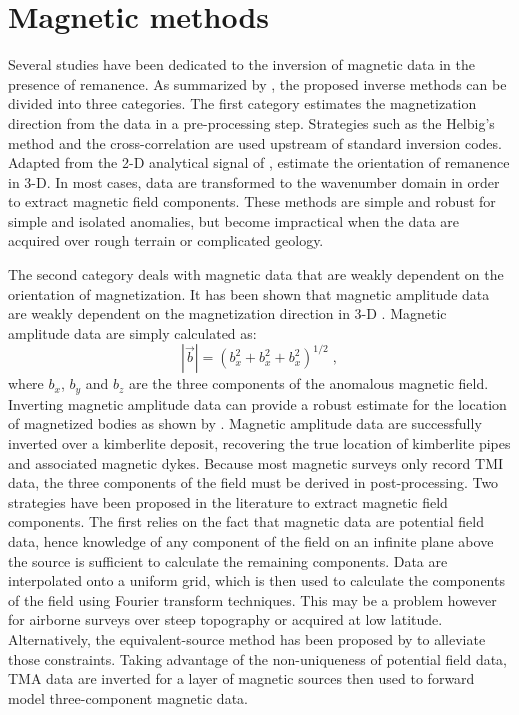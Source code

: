 \section{Magnetic methods}
Several studies have been dedicated to the inversion of magnetic data in the presence of remanence.
As summarized by \cite{Li2012}, the proposed inverse methods can be divided into three categories.
The first category estimates the magnetization direction from the data in a pre-processing step.
Strategies such as the Helbig's method \cite[]{Phillips03} and the cross-correlation \cite[]{DannemillerLi06} are used upstream of standard inversion codes.
Adapted from the 2-D analytical signal of \cite{Nabighian72}, \cite{Roest92} estimate the orientation of remanence in 3-D.
In most cases, data are transformed to the wavenumber domain in order to extract magnetic field components.
These methods are simple and robust for simple and isolated anomalies, but become impractical when the data are acquired over rough terrain or complicated geology.

The second category deals with magnetic data that are weakly dependent on the orientation of magnetization.
It has been shown that magnetic amplitude data are weakly dependent on the magnetization direction in 3-D \cite[]{Nabighian72}.
Magnetic amplitude data are simply calculated as:
\begin{equation}
|\vec b| = {( b_x^2 + b_x^2 + b_x^2 )}^{1/2}\;,
\end{equation}
where $b_x$, $b_y$ and $b_z$ are the three components of the anomalous magnetic field.
Inverting magnetic amplitude data can provide a robust estimate for the location of magnetized bodies
as shown by \cite{Shearer05}. Magnetic amplitude data are successfully inverted over a kimberlite deposit, recovering the true location of kimberlite pipes and associated magnetic dykes.
Because most magnetic surveys only record TMI data, the three components of the field must be derived in post-processing.
Two strategies have been proposed in the literature to extract magnetic field components.
The first relies on the fact that magnetic data are potential field data, hence knowledge of any component of the field on an infinite plane above the source is sufficient to calculate the remaining components. 
Data are interpolated onto a uniform grid, which is then used to calculate the components of the field using Fourier transform techniques.
This may be a problem however for airborne surveys over steep topography or acquired at low latitude.
Alternatively, the equivalent-source method has been proposed by \cite{Li2010} to alleviate those constraints.
Taking advantage of the non-uniqueness of potential field data, TMA data are inverted for a layer of magnetic sources then used to forward model three-component magnetic data.


